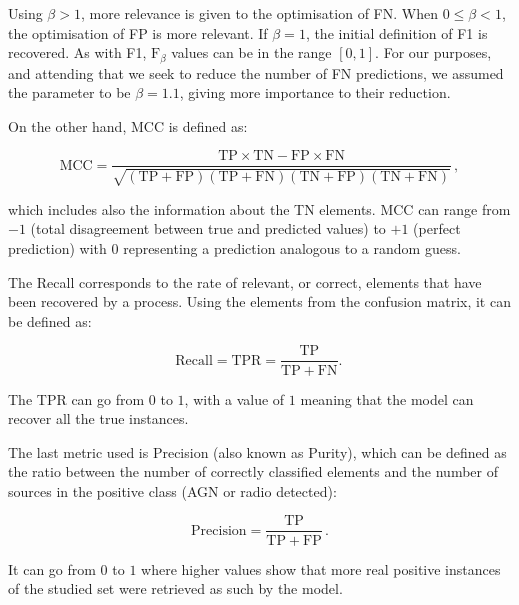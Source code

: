 \documentclass{aa}
\begin{document}
Using ${\beta > 1}$, more relevance is given to the optimisation of FN. When ${0 \leq \beta < 1}$, the optimisation of FP is more relevant. If $\beta = 1$, the initial definition of F1 is recovered. As with F1, $\mathrm{F}_{\beta}$ values can be in the range ${[0, 1]}$. For our purposes, and attending that we seek to reduce the number of FN predictions, we assumed the parameter to be ${\beta = 1.1}$, giving more importance to their reduction.

On the other hand, MCC is defined as:

\begin{equation}\label{eq:mcc}
\mathrm{MCC} = \frac{\mathrm{TP} \times \mathrm{TN} - \mathrm{FP} \times \mathrm{FN}}{\sqrt{(\mathrm{TP} + \mathrm{FP}) (\mathrm{TP} + \mathrm{FN}) (\mathrm{TN} + \mathrm{FP}) (\mathrm{TN} + \mathrm{FN})}}\,,
\end{equation}

\noindent which includes also the information about the TN elements. MCC can range from $-1$ (total disagreement between true and predicted values) to $+1$ (perfect prediction) with $0$ representing a prediction analogous to a random guess.

The Recall \citep[also called Completeness, Sensitivity, or True Positive Rate -TPR-;][]{10.2307/4586294} corresponds to the rate of relevant, or correct, elements that have been recovered by a process. Using the elements from the confusion matrix, it can be defined as:

\begin{equation}\label{eq:recall}
\mathrm{Recall} = \mathrm{TPR} = \frac{\mathrm{TP}}{\mathrm{TP} + \mathrm{FN}}.\,
\end{equation}

The TPR can go from $0$ to $1$, with a value of $1$ meaning that the model can recover all the true instances. 

The last metric used is Precision (also known as Purity), which can be defined as the ratio between the number of correctly classified elements and the number of sources in the positive class (AGN or radio detected): 

\begin{equation}\label{eq:precision}
\mathrm{Precision} = \frac{\mathrm{TP}}{\mathrm{TP} + \mathrm{FP}}\,.
\end{equation}

It can go from $0$ to $1$ where higher values show that more real positive instances of the studied set were retrieved as such by the model.
\end{document}
